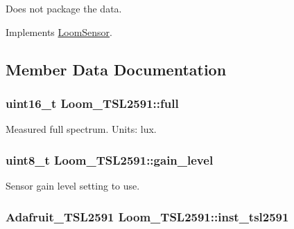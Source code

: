 Does not package the data. 

Implements \hyperlink{class_loom_sensor_aba2aa35441c2eb1cf27b95a1fc08b288}{Loom\+Sensor}.



\subsection{Member Data Documentation}
\subsubsection[{\texorpdfstring{full}{full}}]{\setlength{\rightskip}{0pt plus 5cm}uint16\+\_\+t Loom\+\_\+\+T\+S\+L2591\+::full\hspace{0.3cm}{\ttfamily [protected]}}\hypertarget{class_loom___t_s_l2591_a68c7142a08c2aebc03056f701a272d9b}{}\label{class_loom___t_s_l2591_a68c7142a08c2aebc03056f701a272d9b}


Measured full spectrum. Units\+: lux. 

\subsubsection[{\texorpdfstring{gain\+\_\+level}{gain_level}}]{\setlength{\rightskip}{0pt plus 5cm}uint8\+\_\+t Loom\+\_\+\+T\+S\+L2591\+::gain\+\_\+level\hspace{0.3cm}{\ttfamily [protected]}}\hypertarget{class_loom___t_s_l2591_ab780e3d0e00a84a01405235182821708}{}\label{class_loom___t_s_l2591_ab780e3d0e00a84a01405235182821708}


Sensor gain level setting to use. 

\subsubsection[{\texorpdfstring{inst\+\_\+tsl2591}{inst_tsl2591}}]{\setlength{\rightskip}{0pt plus 5cm}Adafruit\+\_\+\+T\+S\+L2591 Loom\+\_\+\+T\+S\+L2591\+::inst\+\_\+tsl2591\hspace{0.3cm}{\ttfamily [protected]}}\hypertarget{class_loom___t_s_l2591_a158e5d5f081b8d690c034c74d9856199}{}\label{class_loom___t_s_l2591_a158e5d5f081b8d690c034c74d9856199}


